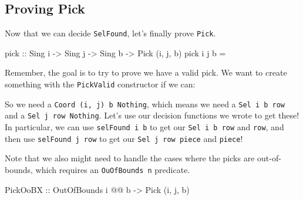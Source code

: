 \documentclass[]{article}
\newenvironment{Shaded}{}{}
\newcommand{\DataTypeTok}[1]{\textcolor[rgb]{0.56,0.13,0.00}{#1}}
\newcommand{\NormalTok}[1]{#1}
\newcommand{\OperatorTok}[1]{\textcolor[rgb]{0.40,0.40,0.40}{#1}}
\newcommand{\OtherTok}[1]{\textcolor[rgb]{0.00,0.44,0.13}{#1}}
\begin{document}
\subsection{Proving Pick}\label{proving-pick}

Now that we can decide \texttt{SelFound}, let's finally prove \texttt{Pick}.

\begin{Shaded}
\begin{Highlighting}[]
\NormalTok{pick}
\OtherTok{    ::} \DataTypeTok{Sing}\NormalTok{ i}
    \OtherTok{{-}\textgreater{}} \DataTypeTok{Sing}\NormalTok{ j}
    \OtherTok{{-}\textgreater{}} \DataTypeTok{Sing}\NormalTok{ b}
    \OtherTok{{-}\textgreater{}} \DataTypeTok{Pick}\NormalTok{ \textquotesingle{}(i, j, b)}
\NormalTok{pick i j b }\OtherTok{=}
\end{Highlighting}
\end{Shaded}

Remember, the goal is to try to prove we have a valid pick. We want to create
something with the \texttt{PickValid} constructor if we can:

\begin{Shaded}
\end{Shaded}

So we need a
\texttt{Coord\ \textquotesingle{}(i,\ j)\ b\ \textquotesingle{}Nothing}, which
means we need a \texttt{Sel\ i\ b\ row} and a
\texttt{Sel\ j\ row\ \textquotesingle{}Nothing}. Let's use our decision
functions we wrote to get these! In particular, we can use
\texttt{selFound\ i\ b} to get our \texttt{Sel\ i\ b\ row} and \texttt{row}, and
then use \texttt{selFound\ j\ row} to get our \texttt{Sel\ j\ row\ piece} and
\texttt{piece}!

Note that we also might need to handle the cases where the picks are
out-of-bounds, which requires an \texttt{OuOfBounds\ n} predicate.

\begin{Shaded}
\begin{Highlighting}[]
\DataTypeTok{PickOoBX}\OtherTok{   ::} \DataTypeTok{OutOfBounds}\NormalTok{ i }\OperatorTok{@@}\NormalTok{ b }\OtherTok{{-}\textgreater{}} \DataTypeTok{Pick}\NormalTok{ \textquotesingle{}(i, j, b)}
\end{Highlighting}
\end{Shaded}
\end{document}
